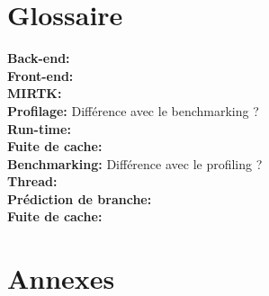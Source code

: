 \documentclass[10pt]{report}
\begin{document}
\chapter*{Glossaire}
\noindent
\textbf{Back-end:}\\ 
\textbf{Front-end:}\\
\textbf{MIRTK:}\\
\textbf{Profilage:} Différence avec le benchmarking ?\\
\textbf{Run-time:}\\
\textbf{Fuite de cache:}\\
\textbf{Benchmarking:} Différence avec le profiling ?\\
\textbf{Thread:}\\
\textbf{Prédiction de branche:}\\
\textbf{Fuite de cache:}\\


\chapter*{Annexes}
\end{document}
